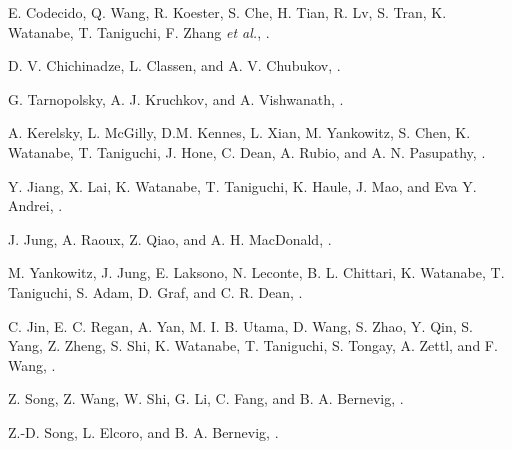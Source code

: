 \documentclass[%
reprint,
amsmath,amssymb,amsfonts
aps,
superscriptaddress,
prx
]{revtex4-1}
\begin{document}
\begin{thebibliography}{99}
 E. Codecido, Q. Wang, R. Koester, S. Che, H. Tian, R. Lv, S. Tran, K. Watanabe, T. Taniguchi, F. Zhang \textit{et al.}, 
\href{https://doi.org/10.1126/sciadv.aaw9770}{}.

 D. V. Chichinadze, L. Classen, and A. V. Chubukov, 
\href{https://doi.org/10.1103/PhysRevB.101.224513}{}.


 G. Tarnopolsky, A. J. Kruchkov, and A. Vishwanath, 
\href{https://doi.org/10.1103/PhysRevLett.122.106405}{}.

 A. Kerelsky, L. McGilly, D.M. Kennes, L. Xian, M. Yankowitz, S. Chen, K. Watanabe, T. Taniguchi, J. Hone, C. Dean, A. Rubio, and A. N. Pasupathy, 
\href{https://doi.org/10.1038/s41586-019-1431-9}{}.

 Y. Jiang, X. Lai, K. Watanabe, T. Taniguchi, K. Haule, J. Mao, and Eva Y. Andrei, 
\href{https://doi.org/10.1038/s41586-019-1460-4}{}.


 J. Jung, A. Raoux, Z. Qiao, and A. H. MacDonald, 
\href{https://doi.org/10.1103/PhysRevB.89.205414}{}.

 M. Yankowitz, J. Jung, E. Laksono, N. Leconte, B. L. Chittari, K. Watanabe, T. Taniguchi, S. Adam, D. Graf, and C. R. Dean, 
\href{https://doi.org/10.1038/s41586-018-0107-1}{}.

 C. Jin, E. C. Regan, A. Yan, M. I. B. Utama, D. Wang, S. Zhao, Y. Qin, S. Yang, Z. Zheng, S. Shi, K. Watanabe, T. Taniguchi, S. Tongay, A. Zettl, and F. Wang, 
\href{https://doi.org/10.1038/s41586-019-0976-y}{}.


 Z. Song, Z. Wang, W. Shi, G. Li, C. Fang, and B. A. Bernevig, 
\href{https://doi.org/10.1103/PhysRevLett.123.036401}{}.

 Z.-D. Song, L. Elcoro, and B. A. Bernevig, 
\href{https://doi.org/10.1126/science.aaz7650}{}.


\end{thebibliography}
\end{document}
